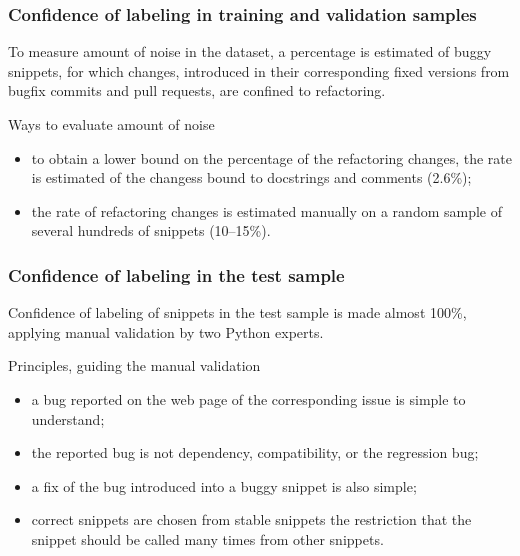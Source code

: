 \documentclass{beamer}
\begin{document}
\begin{frame}
\frametitle{Confidence of labeling in training and validation samples}

To measure amount of noise in the dataset, a percentage is
estimated of buggy snippets, for which changes, introduced in their corresponding fixed versions
from bugfix commits and pull requests, are confined to refactoring.

\begin{block}{Ways to evaluate amount of noise}
\begin{itemize}
\item to obtain a lower bound on the percentage of the
refactoring changes, the rate is estimated of the changess bound to docstrings and
comments (2.6\%);
\item the rate of refactoring changes is estimated manually on a random sample of several hundreds of snippets (10–15\%).
\end{itemize}
\end{block}

\end{frame}

\begin{frame}
\frametitle{Confidence of labeling in the test sample}

Confidence of labeling of snippets in the test sample is made almost 100\%, applying manual validation
by two Python experts.

\begin{block}{Principles, guiding the manual validation}
\begin{itemize}
\item a bug reported on the web page of the corresponding
issue is simple to understand;
\item the reported bug is not dependency, compatibility, or the
regression bug;
\item a fix of the bug introduced into a buggy snippet is also simple;
\item correct snippets are chosen from stable snippets the restriction that
the snippet should be called many times from other snippets.
\end{itemize}
\end{block}


\end{frame}
\end{document}
